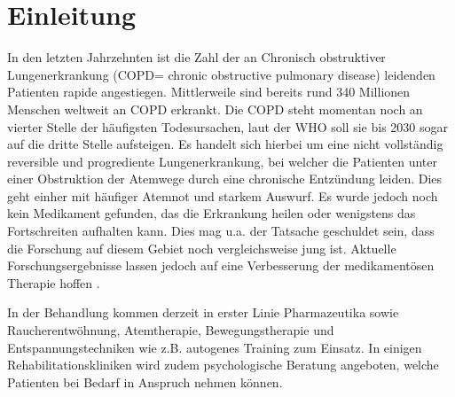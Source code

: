 \chapter{Einleitung}
\label{einleitung}
\ifpdf
    \graphicspath{{1_introduction/figures/PNG/}{1_einleitung/figures/PDF/}{1_einleitung/figures/}}
\else
    \graphicspath{{1_einleitung/figures/EPS/}{1_einleitung/figures/}}
\fi

In den letzten Jahrzehnten ist die Zahl der an Chronisch obstruktiver Lungenerkrankung (COPD= chronic obstructive pulmonary disease) leidenden Patienten rapide angestiegen. Mittlerweile sind bereits rund 340 Millionen Menschen weltweit an COPD erkrankt. Die COPD steht momentan noch an vierter Stelle der häufigsten Todesursachen, laut der WHO soll sie bis 2030 sogar auf die dritte Stelle aufsteigen. Es handelt sich hierbei um eine nicht vollständig reversible und progrediente Lungenerkrankung, bei welcher die Patienten unter einer Obstruktion der Atemwege durch eine chronische Entzündung leiden. Dies geht einher mit häufiger Atemnot und starkem Auswurf.
Es wurde jedoch noch kein Medikament gefunden, das die Erkrankung heilen oder wenigstens das Fortschreiten aufhalten kann. Dies mag u.a. der Tatsache geschuldet sein, dass die Forschung auf diesem Gebiet noch vergleichsweise jung ist. Aktuelle Forschungsergebnisse lassen jedoch auf eine Verbesserung der medikamentösen Therapie hoffen \autocite[vgl.]{doccheck2014}.

In der Behandlung kommen derzeit in erster Linie Pharmazeutika sowie Raucherentwöhnung, Atemtherapie, Bewegungstherapie und Entspannungstechniken wie z.B. autogenes Training zum Einsatz. In einigen Rehabilitationskliniken wird zudem psychologische Beratung angeboten, welche Patienten bei Bedarf in Anspruch nehmen können.

